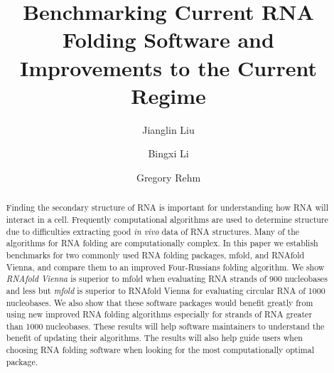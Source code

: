 \documentclass[12pt]{article}
\title{Benchmarking Current RNA Folding Software and Improvements to the Current Regime}
\begin{document}
\author{Jianglin Liu}
\author{Bingxi Li}
\author{Gregory Rehm}
\maketitle

\begin{abstract}
Finding the secondary structure of RNA is important for understanding how RNA
will interact in a cell. Frequently computational algorithms are used to determine
structure due to difficulties extracting good \textit{in vivo} data of RNA
structures. Many of the algorithms for RNA folding are computationally complex.
In this paper we establish benchmarks for two commonly used RNA folding packages,
mfold, and RNAfold Vienna, and compare them to an improved Four-Russians folding
algorithm. We show \textit{RNAfold Vienna} is superior to mfold when evaluating RNA
strands of 900 nucleobases and less but \textit{mfold} is superior to RNAfold Vienna for
evaluating circular RNA of 1000 nucleobases. We also show that these software
packages would benefit greatly from using new improved RNA folding algorithms especially for strands
of RNA greater than 1000 nucleobases. These results will help software maintainers to understand
the benefit of updating their algorithms. The results will also help guide users
when choosing RNA folding software when looking for the most computationally optimal package.
\end{abstract}
\end{document}
